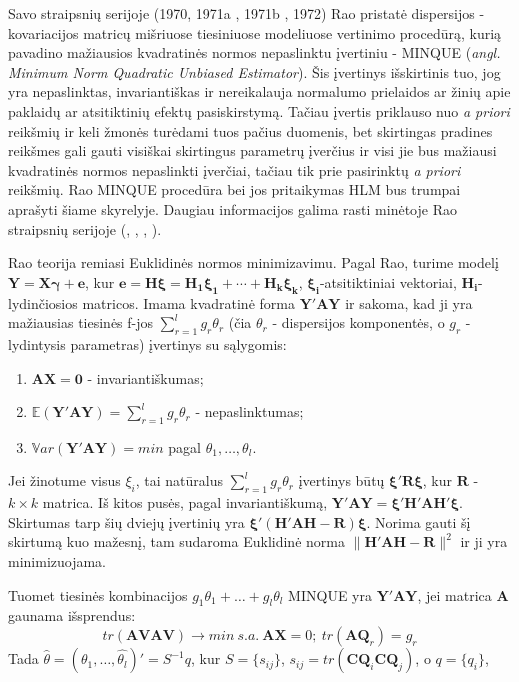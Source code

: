 \documentclass[12pt,a4paper]{article}
\begin{document}
\indent Savo straipsnių serijoje (1970\cite{rao1970}, 1971a\cite{rao1971a} , 1971b\cite{rao1971b} , 1972\cite{rao1972}) Rao pristatė dispersijos - kovariacijos matricų mišriuose tiesiniuose modeliuose vertinimo procedūrą, kurią pavadino mažiausios kvadratinės normos nepaslinktu įvertiniu - MINQUE (\textit{angl. Minimum Norm Quadratic Unbiased Estimator}). Šis įvertinys išskirtinis tuo, jog yra nepaslinktas, invariantiškas ir nereikalauja normalumo prielaidos ar žinių apie paklaidų ar atsitiktinių efektų pasiskirstymą. Tačiau įvertis priklauso nuo \textit{a priori} reikšmių ir keli žmonės turėdami tuos pačius duomenis, bet skirtingas pradines reikšmes gali gauti visiškai skirtingus parametrų įverčius ir visi jie bus mažiausi kvadratinės normos nepaslinkti įverčiai, tačiau tik prie pasirinktų \textit{a priori} reikšmių. Rao MINQUE procedūra bei jos pritaikymas HLM bus trumpai aprašyti šiame skyrelyje. Daugiau informacijos galima rasti minėtoje Rao straipsnių serijoje (\cite{rao1970}, \cite{rao1971a} , \cite{rao1971b} , \cite{rao1972}).

\indent Rao teorija remiasi Euklidinės normos minimizavimu. Pagal Rao, turime modelį $\mathbf{Y}=\mathbf{X}\boldsymbol{\gamma}+\mathbf{e}$, kur $\mathbf{e}=\mathbf{H\boldsymbol{\xi}}=\mathbf{\boldsymbol{H_1\xi_1+\cdots +H_k \xi_k}}$, $\boldsymbol{\xi_i}$-atsitiktiniai vektoriai, $\mathbf{H_i}$-lydinčiosios matricos. Imama kvadratinė forma $\mathbf{Y'AY}$ ir sakoma, kad ji yra mažiausias tiesinės f-jos $\sum^l_{r=1} g_r\theta_r$ (čia $\theta_r$ - dispersijos komponentės, o $g_r$ - lydintysis parametras) įvertinys su sąlygomis:
\begin{enumerate}
\item $\mathbf{AX=0}$ - invariantiškumas;
\item $\mathbb{E}\left(\mathbf{Y'AY}\right)=\sum^l_{r=1} g_r\theta_r$ - nepaslinktumas;
\item $\mathbb{V}ar\left(\mathbf{Y'AY}\right)=min$ pagal $\theta_1, \dots, \theta_l$.
\end{enumerate}

\indent Jei žinotume visus $\xi_i$, tai natūralus $\sum^l_{r=1} g_r\theta_r$ įvertinys būtų $\boldsymbol{\xi'R\xi}$, kur $\mathbf{R}$ - $k\times k$ matrica. Iš kitos pusės, pagal invariantiškumą, $\mathbf{Y'AY=\boldsymbol{\xi'H'AH'\xi}}$. Skirtumas tarp šių dviejų įvertinių yra $\boldsymbol{\xi'\left(H'AH-R\right)\xi}$. Norima gauti šį skirtumą kuo mažesnį, tam sudaroma Euklidinė norma $\|\boldsymbol{H'AH-R}\|^2$ ir ji yra minimizuojama.

\indent Tuomet tiesinės kombinacijos $g_1 \theta_1+\dots+g_l \theta_l$ MINQUE yra $\mathbf{Y'AY}$, jei matrica $\mathbf{A}$ gaunama išsprendus:
\[tr(\mathbf{AVAV}) \to min \ s.a. \ \mathbf{AX} = 0;\ tr(\mathbf{AQ}_r)=g_r\]
\indent Tada $\hat{\theta} = (\hat{\theta_1},\dots,\hat{\theta_l})'=S^{-1}q$, kur $S=\{s_{ij}\}$, $s_{ij}=tr(\mathbf{CQ}_i\mathbf{CQ}_j)$, o
$q=\{q_i\}$,
\end{document}
